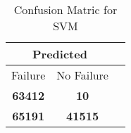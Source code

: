 \begin{table}[] 
\caption{Confusion Matric for SVM} 
\label{Table: Prediction Accuracy-NoneSVMRandomForest100EKF-ignoresolarPanelDipole100.9EKF-top2-solarPanelDipole} 
\centering 
\begin{tabular} 
 {@{}ccc@{}} 
\toprule 
\multicolumn{2}{c}{\textbf{Predicted}}
 \\ \midrule 
\multicolumn{1}{|c|}{Failure} & 
\multicolumn{1}{c|}{No Failure}
 \\ \midrule 
\multicolumn{1}{|c|}{\color{red}\textbf{63412}} & 
\multicolumn{1}{c|}{\color{red}\textbf{10}}
 \\ \midrule 
\multicolumn{1}{|c|}{\color{green}\textbf{65191}} & 
\multicolumn{1}{c|}{\color{green}\textbf{41515}}
 \\ \bottomrule 
\end{tabular} 
\end{table} 
